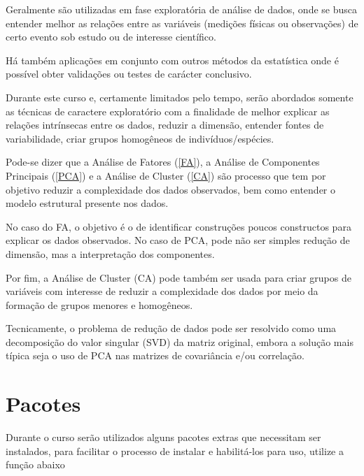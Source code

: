 \documentclass[]{book}
\newenvironment{Shaded}{\begin{snugshade}}{\end{snugshade}}
\newcommand{\KeywordTok}[1]{\textcolor[rgb]{0.13,0.29,0.53}{\textbf{{#1}}}}
\newcommand{\DataTypeTok}[1]{\textcolor[rgb]{0.13,0.29,0.53}{{#1}}}
\newcommand{\DecValTok}[1]{\textcolor[rgb]{0.00,0.00,0.81}{{#1}}}
\newcommand{\StringTok}[1]{\textcolor[rgb]{0.31,0.60,0.02}{{#1}}}
\newcommand{\OtherTok}[1]{\textcolor[rgb]{0.56,0.35,0.01}{{#1}}}
\newcommand{\NormalTok}[1]{{#1}}
\begin{document}
Geralmente são utilizadas em fase exploratória de análise de dados, onde
se busca entender melhor as relações entre as variáveis (medições
físicas ou observações) de certo evento sob estudo ou de interesse
científico.

Há também aplicações em conjunto com outros métodos da estatística onde
é possível obter validações ou testes de carácter conclusivo.

Durante este curso e, certamente limitados pelo tempo, serão abordados
somente as técnicas de caractere exploratório com a finalidade de melhor
explicar as relações intrínsecas entre os dados, reduzir a dimensão,
entender fontes de variabilidade, criar grupos homogêneos de
indivíduos/espécies.

Pode-se dizer que a Análise de Fatores (\ref{FA}), a Análise de
Componentes Principais (\ref{PCA}) e a Análise de Cluster (\ref{CA}) são
processo que tem por objetivo reduzir a complexidade dos dados
observados, bem como entender o modelo estrutural presente nos dados.

No caso do FA, o objetivo é o de identificar construções poucos
constructos para explicar os dados observados. No caso de PCA, pode não
ser simples redução de dimensão, mas a interpretação dos componentes.

Por fim, a Análise de Cluster (CA) pode também ser usada para criar
grupos de variáveis com interesse de reduzir a complexidade dos dados
por meio da formação de grupos menores e homogêneos.

Tecnicamente, o problema de redução de dados pode ser resolvido como uma
decomposição do valor singular (SVD) da matriz original, embora a
solução mais típica seja o uso de PCA nas matrizes de covariância e/ou
correlação.

\section{Pacotes}\label{pacotes}

Durante o curso serão utilizados alguns pacotes extras que necessitam
ser instalados, para facilitar o processo de instalar e habilitá-los
para uso, utilize a função abaixo

\begin{Shaded}
\end{Shaded}
\end{document}
